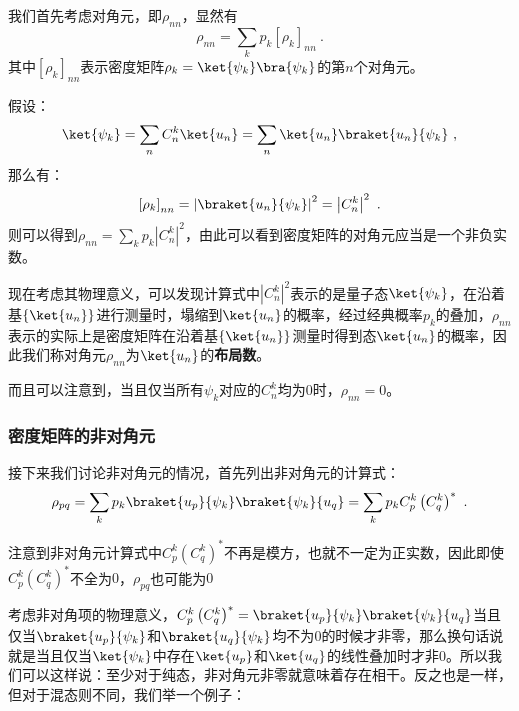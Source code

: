 我们首先考虑对角元，即$\rho_{nn}$，显然有
$$\rho_{nn} = \sum\limits_{k} p_k \left[\rho_k\right]_{nn}~.$$
其中$\left[\rho_k\right]_{nn}$表示密度矩阵$\rho_k = \ket{\psi_k}\bra{\psi_k}$的第$n$个对角元。

假设：
$$\ket{\psi_k} = \sum\limits_n C_n^{k}\ket{u_n} = \sum\limits_n\ket{u_n}\braket{u_n}{\psi_k}~,$$
那么有：
$$\left[\rho_k\right]_{nn} = \left|\braket{u_n}{\psi_k}\right|^2 = \left| C_n^{k}\right|^2~.$$
则可以得到$\rho_{nn} = \sum\limits_k p_k \left|C_n^k\right|^2$，由此可以看到密度矩阵的对角元应当是一个非负实数。

现在考虑其物理意义，可以发现计算式中$\left| C_n^k \right|^2$表示的是量子态$\ket{\psi_k}$，在沿着基$\left\{\ket{u_n}\right\}$进行测量时，塌缩到$\ket{u_n}$的概率，经过经典概率$p_k$的叠加，$\rho_{nn}$表示的实际上是密度矩阵在沿着基$\left\{\ket{u_n}\right\}$测量时得到态$\ket{u_n}$的概率，因此我们称对角元$\rho_{nn}$为$\ket{u_n}$的\textbf{布局数}。

而且可以注意到，当且仅当所有$\psi_k$对应的$C_n^k$均为$0$时，$\rho_{nn} = 0$。

\subsubsection{密度矩阵的非对角元}

接下来我们讨论非对角元的情况，首先列出非对角元的计算式：
$$\rho_{pq} = \sum\limits_k p_k \braket{u_p}{\psi_k}\braket{\psi_k}{u_q} = \sum\limits_k p_k C_p^k \left(C_q^k\right)^*~.$$

注意到非对角元计算式中$C_p^k\left(C_q^k\right)^*$不再是模方，也就不一定为正实数，因此即使$C_p^k \left(C_q^k\right)^*$不全为$0$，$\rho_{pq}$也可能为$0$

考虑非对角项的物理意义，$C_p^k\left(C_q^k\right)^* = \braket{u_p}{\psi_k}\braket{\psi_k}{u_q}$当且仅当$\braket{u_p}{\psi_k}$和$\braket{u_q}{\psi_k}$均不为$0$的时候才非零，那么换句话说就是当且仅当$\ket{\psi_k}$中存在$\ket{u_p}$和$\ket{u_q}$的线性叠加时才非$0$。所以我们可以这样说：至少对于纯态，非对角元非零就意味着存在相干。反之也是一样，但对于混态则不同，我们举一个例子：


